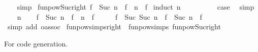 \begin{isabellebody}
%
\isadelimproof
\ \ %
\endisadelimproof
%
\isatagproof
{}\isamarkupfalse%
\ simp%
\endisatagproof
{\isafoldproof}%
%
\isadelimproof
\isanewline
%
\endisadelimproof
\isanewline
{}\isamarkupfalse%
\ funpow{\isacharunderscore}{\kern0pt}Suc{\isacharunderscore}{\kern0pt}right{\isacharcolon}{\kern0pt}\ {\isachardoublequoteopen}f\ {\isacharcircum}{\kern0pt}{\isacharcircum}{\kern0pt}\ Suc\ n\ {\isacharequal}{\kern0pt}\ f\ {\isacharcircum}{\kern0pt}{\isacharcircum}{\kern0pt}\ n\ {\isasymcirc}\ f{\isachardoublequoteclose}\isanewline
%
\isadelimproof
%
\endisadelimproof
%
\isatagproof
{}\isamarkupfalse%
\ {\isacharparenleft}{\kern0pt}induct\ n{\isacharparenright}{\kern0pt}\isanewline
\ \ \isamarkupfalse%
\ {}\isanewline
\ \ \isamarkupfalse%
\ \isamarkupfalse%
\ {\isacharquery}{\kern0pt}case\ \isamarkupfalse%
\ simp\isanewline
{}\isamarkupfalse%
\isanewline
\ \ \isamarkupfalse%
\ n\isanewline
\ \ \isamarkupfalse%
\ {\isachardoublequoteopen}f\ {\isacharcircum}{\kern0pt}{\isacharcircum}{\kern0pt}\ Suc\ n\ {\isacharequal}{\kern0pt}\ f\ {\isacharcircum}{\kern0pt}{\isacharcircum}{\kern0pt}\ n\ {\isasymcirc}\ f{\isachardoublequoteclose}\isanewline
\ \ \isamarkupfalse%
\ \isamarkupfalse%
\ {\isachardoublequoteopen}f\ {\isacharcircum}{\kern0pt}{\isacharcircum}{\kern0pt}\ Suc\ {\isacharparenleft}{\kern0pt}Suc\ n{\isacharparenright}{\kern0pt}\ {\isacharequal}{\kern0pt}\ f\ {\isacharcircum}{\kern0pt}{\isacharcircum}{\kern0pt}\ Suc\ n\ {\isasymcirc}\ f{\isachardoublequoteclose}\isanewline
\ \ \ \ \isamarkupfalse%
\ {\isacharparenleft}{\kern0pt}simp\ add{\isacharcolon}{\kern0pt}\ o{\isacharunderscore}{\kern0pt}assoc{\isacharparenright}{\kern0pt}\isanewline
{}\isamarkupfalse%
%
\endisatagproof
{\isafoldproof}%
%
\isadelimproof
\isanewline
%
\endisadelimproof
\isanewline
{}\isamarkupfalse%
\ funpow{\isacharunderscore}{\kern0pt}simps{\isacharunderscore}{\kern0pt}right\ {\isacharequal}{\kern0pt}\ funpow{\isachardot}{\kern0pt}simps{\isacharparenleft}{\kern0pt}{}{\isacharparenright}{\kern0pt}\ funpow{\isacharunderscore}{\kern0pt}Suc{\isacharunderscore}{\kern0pt}right%
\begin{isamarkuptext}%
For code generation.%
\end{isamarkuptext}\isamarkuptrue%
\isamarkupfalse%
\isanewline
{}\isanewline
\isanewline
{}\ \isamarkupfalse%

\end{isabellebody}
